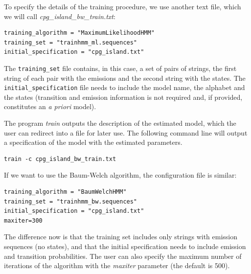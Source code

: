 \documentclass[10pt]{article}
\begin{document}
To specify the details of the training procedure, we use another text file, which we will call \textit{cpg\_island\_bw\_train.txt}:

\vspace{1em}

\begin{Verbatim}[frame=single, label=cpg\_island\_ml\_train.txt]
training_algorithm = "MaximumLikelihoodHMM"
training_set = "trainhmm_ml.sequences"
initial_specification = "cpg_island.txt"
\end{Verbatim}

\vspace{1em}

The \texttt{training\_set} file contains, in this case, a set of pairs of strings, the first string of each pair with the emissions and the second string with the states. The \texttt{initial\_specification} file needs to include the model name, the alphabet and the states (transition and emission information is not required and, if provided, constitutes an {\it a priori} model). 

The program \textit{train} outputs the description of the estimated model, which the user can redirect into a file for later use. The following command line will output a specification of the model with the  estimated parameters.

\begin{Verbatim}[frame=single, label={Command line}]
train -c cpg_island_bw_train.txt
\end{Verbatim}

If we want to use the Baum-Welch algorithm, the configuration file is similar:


\vspace{1em}

\begin{Verbatim}[frame=single, label=cpg\_island\_bw\_train.txt]
training_algorithm = "BaumWelchHMM"
training_set = "trainhmm_bw.sequences"
initial_specification = "cpg_island.txt"
maxiter=300
\end{Verbatim}

The difference now is that  the training set includes only strings with emission sequences (no states), and that the initial specification needs to include emission and transition probabilities. The user can also specify the maximum number of iterations  of the algorithm with the \textit{maxiter} parameter (the default is 500).

\vspace{1em}
\end{document}
